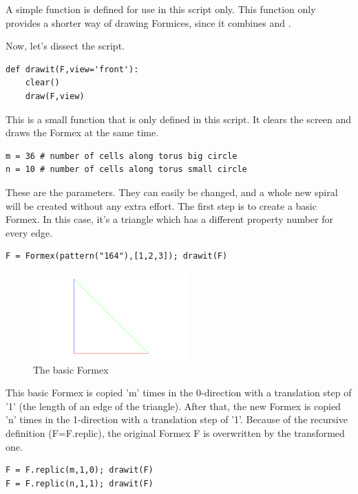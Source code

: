 A simple function  is defined for use in this script only. This function only provides a shorter way of drawing Formices, since it combines  and . 

Now, let's dissect the script.

\begin{verbatim}
def drawit(F,view='front'):
    clear()
    draw(F,view)
\end{verbatim}
This is a small function that is only defined in this script. It clears the screen and draws the Formex at the same time. 

\begin{verbatim}
m = 36 # number of cells along torus big circle
n = 10 # number of cells along torus small circle
\end{verbatim}
These are the parameters. They can easily be changed, and a whole new spiral will be created without any extra effort.
The first step is to create a basic Formex. In this case, it's a triangle which has a different property number for every edge.
\begin{verbatim}
F = Formex(pattern("164"),[1,2,3]); drawit(F)  
\end{verbatim}
\begin{figure}[ht]
  \centering
  \begin{makeimage}
  \end{makeimage}
  \begin{latexonly}
    \includegraphics[width=6cm]{images/spiral-000}
  \end{latexonly}
  \begin{htmlonly}
  \end{htmlonly}  
  \caption{The basic Formex}
\end{figure}

This basic Formex is copied 'm' times in the 0-direction with a translation 
step of '1' (the length of an edge of the triangle). After that, the new 
Formex is copied 'n' times in the 1-direction with a translation step of '1'. 
Because of the recursive definition (F=F.replic), the original Formex F is 
overwritten by the transformed one.
\begin{verbatim}
F = F.replic(m,1,0); drawit(F)
F = F.replic(n,1,1); drawit(F)
\end{verbatim}

